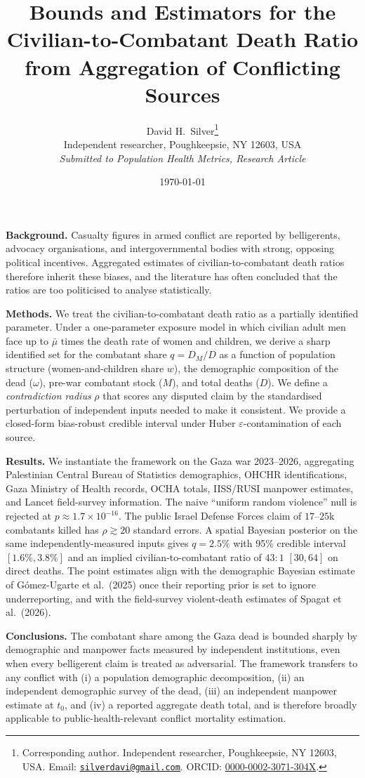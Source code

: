 \documentclass[11pt,a4paper]{article}
\title{\textbf{Bounds and Estimators for the Civilian-to-Combatant Death Ratio\\ from Aggregation of Conflicting Sources}}
\author{David H.\ Silver\thanks{Corresponding author. Independent researcher, Poughkeepsie, NY 12603, USA. Email: \href{mailto:silverdavi@gmail.com}{\texttt{silverdavi@gmail.com}}. ORCID: \href{https://orcid.org/0000-0002-3071-304X}{0000-0002-3071-304X}.}\\
  \small Independent researcher, Poughkeepsie, NY 12603, USA\\[2pt]
  \small\emph{Submitted to Population Health Metrics, Research Article}}
\date{\today}
\theoremstyle{plain}
\theoremstyle{definition}
\theoremstyle{remark}
\begin{document}
\maketitle

\noindent\textbf{Background.}\;
Casualty figures in armed conflict are reported by belligerents, advocacy organisations, and intergovernmental bodies with strong, opposing political incentives. Aggregated estimates of civilian-to-combatant death ratios therefore inherit these biases, and the literature has often concluded that the ratios are too politicised to analyse statistically.

\medskip\noindent\textbf{Methods.}\;
We treat the civilian-to-combatant death ratio as a partially identified parameter. Under a one-parameter exposure model in which civilian adult men face up to $\bar\mu$ times the death rate of women and children, we derive a sharp identified set for the combatant share $q=D_M/D$ as a function of population structure (women-and-children share $w$), the demographic composition of the dead ($\omega$), pre-war combatant stock ($M$), and total deaths ($D$). We define a \emph{contradiction radius} $\rho$ that scores any disputed claim by the standardised perturbation of independent inputs needed to make it consistent. We provide a closed-form bias-robust credible interval under Huber $\varepsilon$-contamination of each source.

\medskip\noindent\textbf{Results.}\;
We instantiate the framework on the Gaza war 2023--2026, aggregating Palestinian Central Bureau of Statistics demographics, OHCHR identifications, Gaza Ministry of Health records, OCHA totals, IISS/RUSI manpower estimates, and Lancet field-survey information. The naive ``uniform random violence'' null is rejected at $p\approx 1.7\times 10^{-16}$. The public Israel Defense Forces claim of $17$--$25$k combatants killed has $\rho\gtrsim 20$ standard errors. A spatial Bayesian posterior on the same independently-measured inputs gives $q=2.5\%$ with 95\% credible interval $[1.6\%,3.8\%]$ and an implied civilian-to-combatant ratio of $43{:}1$ \mbox{$[30,64]$} on direct deaths. The point estimates align with the demographic Bayesian estimate of G\'{o}mez-Ugarte et al.\ (2025) once their reporting prior is set to ignore underreporting, and with the field-survey violent-death estimates of Spagat et al.\ (2026).

\medskip\noindent\textbf{Conclusions.}\;
The combatant share among the Gaza dead is bounded sharply by demographic and manpower facts measured by independent institutions, even when every belligerent claim is treated as adversarial. The framework transfers to any conflict with (i) a population demographic decomposition, (ii) an independent demographic survey of the dead, (iii) an independent manpower estimate at $t_0$, and (iv) a reported aggregate death total, and is therefore broadly applicable to public-health-relevant conflict mortality estimation.
\end{document}
